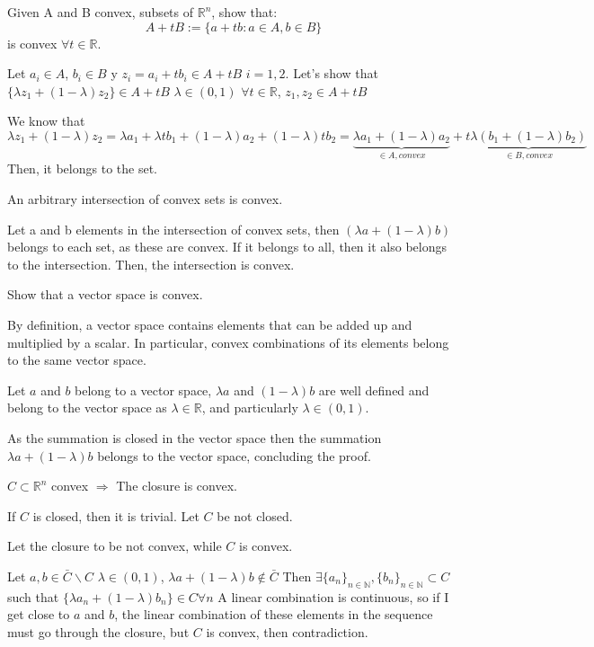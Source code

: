 \documentclass[answers]{exam}
\theoremstyle{definition}
\begin{document}
\begin{questions}
\question Given A and B convex, subsets of $\mathds{R}^n$, show that: $$A+tB:=\{a+tb:a\in A, b\in B\}$$ is convex $\forall t\in\mathds{R}$.
    \begin{solution}
        Let $a_i\in A$, $b_i\in B$ y $z_i=a_i+tb_i\in A+tB$ $i=1,2$.
        Let's show that $\{\lambda z_1+(1-\lambda)z_2\}\in A+tB$ $\lambda \in (0,1)$ $\forall t\in \mathds{R}$, $z_1, z_2 \in A+tB$
        
        We know that $$\lambda z_1+(1-\lambda)z_2=\lambda a_1+\lambda tb_1+(1-\lambda)a_2+(1-\lambda)tb_2=\underbrace{\lambda a_1+(1-\lambda)a_2}_{\in A, convex}+t\underbrace{\lambda (b_1+(1-\lambda)b_2)}_{\in B, convex}$$
        Then, it belongs to the set.
    \end{solution}

\question An arbitrary intersection of convex sets is convex.
    \begin{solution}
    Let a and b elements in the intersection of convex sets, then $(\lambda a+(1-\lambda)b)$ belongs to each set, as these are convex. If it belongs to all, then it also belongs to the intersection. Then, the intersection is convex.
    \end{solution}
    
\item Show that a vector space is convex.
    \begin{solution}
        By definition, a vector space contains elements that can be added up and multiplied by a scalar. In particular, convex combinations of its elements belong to the same vector space.
        
        Let $a$ and $b$ belong to a vector space, $\lambda a$ and $(1-\lambda)b$ are well defined and belong to the vector space as $\lambda\in\mathds{R}$, and particularly $\lambda \in(0,1)$.
        
        As the summation is closed in the vector space then the summation $\lambda a+(1-\lambda)b$ belongs to the vector space, concluding the proof.
    \end{solution}

\question $C\subset\mathds{R}^n$ convex $\Rightarrow$ The closure is convex.
    \begin{solution}
    If $C$ is closed, then it is trivial. Let $C$ be not closed.
    
    Let the closure to be not convex, while $C$ is convex.
    
    Let $a,b\in \bar{C} \backslash C$ $\lambda \in (0,1)$, $\lambda a+ (1-\lambda)b \not\in \bar{C}$
    Then $\exists \{a_n\}_{n\in\mathds{N}}, \{b_n\}_{n\in\mathds{N}} \subset C$ such that $\{\lambda a_n+(1-\lambda)b_n\}\in C\forall n$ A linear combination is continuous, so if I get close to $a$ and $b$, the linear combination of these elements in the sequence must go through the closure, but $C$ is convex, then contradiction.
    \end{solution}
    


\end{questions}
\end{document}
